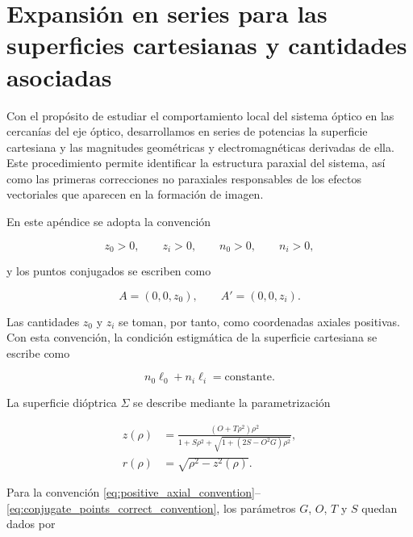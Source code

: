 \chapter{Expansión en series para las superficies cartesianas y cantidades asociadas}
\label{apx:ovoids_series}
\label{sec:series_expansion_cartesian_surfaces}

Con el propósito de estudiar el comportamiento local del sistema óptico en las cercanías del eje óptico, desarrollamos en series de potencias la superficie cartesiana y las magnitudes geométricas y electromagnéticas derivadas de ella. Este procedimiento permite identificar la estructura paraxial del sistema, así como las primeras correcciones no paraxiales responsables de los efectos vectoriales que aparecen en la formación de imagen.

En este apéndice se adopta la convención

\begin{equation}
z_0>0,
\qquad
z_i>0,
\qquad
n_0>0,
\qquad
n_i>0,
\label{eq:positive_axial_convention}
\end{equation}

y los puntos conjugados se escriben como

\begin{equation}
A=(0,0,z_0),
\qquad
A'=(0,0,z_i).
\label{eq:conjugate_points_correct_convention}
\end{equation}

Las cantidades \(z_0\) y \(z_i\) se toman, por tanto, como coordenadas axiales positivas. Con esta convención, la condición estigmática de la superficie cartesiana se escribe como

\begin{equation}
n_0\ell_0+n_i\ell_i
=
\text{constante}.
\label{eq:stigmatic_condition_correct_convention}
\end{equation}

La superficie dióptrica \(\Sigma\) se describe mediante la parametrización

\begin{align}
z(\rho)
&=
\frac{(O+T\rho^2)\rho^2}
{1+S\rho^2+\sqrt{1+(2S-O^2G)\rho^2}},
\label{eq:cartesian_surface_parametrization_z}
\\[6pt]
r(\rho)
&=
\sqrt{\rho^2-z^2(\rho)}.
\label{eq:cartesian_surface_parametrization_r}
\end{align}

Para la convención \eqref{eq:positive_axial_convention}--\eqref{eq:conjugate_points_correct_convention}, los parámetros \(G\), \(O\), \(T\) y \(S\) quedan dados por

